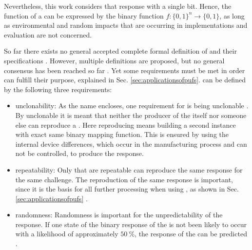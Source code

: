 Nevertheless, this work considers \pufs that response with a single bit.
Hence, the function of a \puf can be expressed by the binary function $f: \{0, 1\}^n \to \{0,1\}$, as long as environmental and random impacts that are occurring in \puf implementations and evaluation are not concerned. %

So far there exists no general accepted complete formal definition of \pufs and their specifications \cite{Becker2015ThePUFs}.
However, multiple definitions are proposed, but no general consensus has been reached so far \cite{Armknecht2011AFunctions,Ruhrmair2014PUFsGlance,Tehranipoor2012IntroductionTrust}.
Yet some requirements must be met in order \pufs can fulfill their purpose, explained in Sec. \ref{sec:applicationsofpufs}.
\pufs can be defined by the following three requirements:


\begin{itemize}
\item unclonability: As the name \puf encloses, one requirement for \pufs is being unclonable \cite{Tajik2014PhysicalPUFs}.
By unclonable it is meant that neither the producer of the \puf itself nor someone else can reproduce a \puf.
Here reproducing means building a second instance with exact same binary mapping function.
This is ensured by using the internal device differences, which occur in the manufacturing process and can not be controlled, to produce the \puf response.
\item repeatability: Only \pufs that are repeatable can reproduce the same response for the same challenge.
The reproduction of the same response is important, since it is the basis for all further processing when using \pufs, as shown in Sec. \ref{sec:applicationsofpufs} \cite{Armknecht2011AFunctions}.
\item randomness: Randomness is important for the unpredictability of the \puf response.
If one state of the binary response of the \puf is not been likely to occur with a likelihood of approximately $50\ \%$, the response of the \puf can be predicted \cite{CherifJouini2011PerformanceStatistics}.
\end{itemize}

